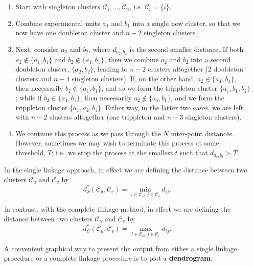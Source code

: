 \documentclass[]{book}
\theoremstyle{definition}
\theoremstyle{definition}
\theoremstyle{definition}
\theoremstyle{remark}
\begin{document}
\begin{enumerate}
\def\labelenumi{\arabic{enumi}.}
\item
  Start with singleton clusters \(\mathcal{C}_1, \ldots , \mathcal{C}_n\), i.e. \(\mathcal{C}_i =\{i\}\).
\item
  Combine experimental units \(a_1\) and \(b_1\) into a single new cluster, so that we now have one doubleton cluster and \(n-2\) singleton clusters.
\item
  Next, consider \(a_2\) and \(b_2\), where \(d_{a_2,b_2}\) is the second smaller distance. If both \(a_2 \notin \{a_1,b_1\}\) and \(b_2 \notin \{a_1,b_1\}\), then we combine \(a_2\) and \(b_2\) into a second doubleton cluster,
  \(\{a_2, b_2\}\), leading to \(n-2\) clusters altogether (\(2\) doubleton clusters and \(n-4\) singleton clusters). If, on the other hand, \(a_2 \in \{a_1,b_1\}\), then necessarily \(b_2 \notin \{a_1,b_1\}\), and so we form the trippleton cluster \(\{a_1,b_1,b_2\}\); while if \(b_2 \in \{a_1, b_1\}\), then necessarily \(a_2 \notin \{a_1, b_1\}\), and we form the trippleton cluster \(\{a_1, a_2, b_1\}\). Either way, in the latter two cases, we are left with \(n-2\) clusters altogether (one trippleton and \(n-3\) singleton clusters).
\item
  We continue this process as we pass through the \(N\) inter-point distances. However, sometimes we may wish to terminate this process at some threshold, \(T\); i.e.~we stop the process at the smallest \(t\) such that
  \(d_{a_t, b_t}>T\).
\end{enumerate}

In the single linkage approach, in effect we are defining the distance between two clusters \(\mathcal{C}_u\) and \(\mathcal{C}_v\) by
\[
 d_S^\ast(\mathcal{C}_u, \mathcal{C}_v)=\min_{i \in \mathcal{C}_u, \, j \in \mathcal{C}_v} d_{ij}.
 \]

In contrast, with the complete linkage method, in effect we are defining the distance between two clusters \(\mathcal{C}_u\) and \(\mathcal{C}_v\) by
\[
d_C^\ast(\mathcal{C}_u, \mathcal{C}_v)=\max_{i \in \mathcal{C}_u, \, j \in \mathcal{C}_v} d_{ij}.
\]

A convenient graphical way to present the output from either a single linkage procedure or a complete linkage procedure is to plot a \textbf{dendrogram}.
\end{document}
